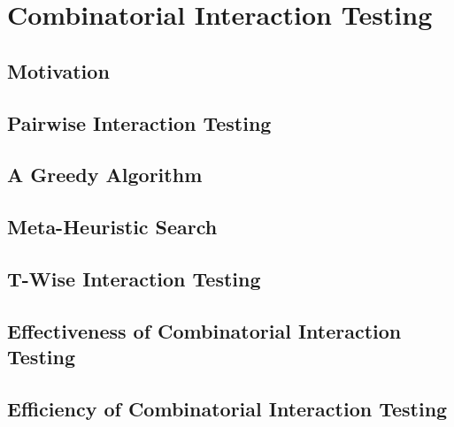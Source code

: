 

\subtitle{11. Product-Line Testing}
\author{Thomas Thüm}





\section{Combinatorial Interaction Testing}

\subsection{Motivation}

\subsection{Pairwise Interaction Testing}

\subsection{A Greedy Algorithm}

\subsection{Meta-Heuristic Search}

\subsection{T-Wise Interaction Testing}

\subsection{Effectiveness of Combinatorial Interaction Testing}

\subsection{Efficiency of Combinatorial Interaction Testing}

%

\lessonslearned{
	\item \ldots
}{
	\item \ldots
}{
	\ldots
}

\sectionend

